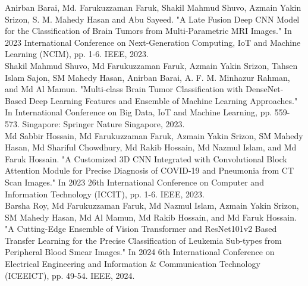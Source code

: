 \documentclass[a4paper,10pt]{article}
\begin{document}
{ Anirban Barai, Md. Farukuzzaman Faruk, Shakil Mahmud Shuvo, Azmain Yakin Srizon, S. M. Mahedy Hasan and Abu Sayeed. "A Late Fusion Deep CNN Model for the Classification of Brain Tumors from Multi-Parametric MRI Images." In 2023 International Conference on Next-Generation Computing, IoT and Machine Learning (NCIM), pp. 1-6. IEEE, 2023.
\vspace{2mm}\\
 Shakil Mahmud Shuvo, Md Farukuzzaman Faruk, Azmain Yakin Srizon, Tahsen Islam Sajon, SM Mahedy Hasan, Anirban Barai, A. F. M. Minhazur Rahman, and Md Al Mamun. "Multi-class Brain Tumor Classification with DenseNet-Based Deep Learning Features and Ensemble of Machine Learning Approaches." In International Conference on Big Data, IoT and Machine Learning, pp. 559-573. Singapore: Springer Nature Singapore, 2023.
\vspace{2mm}\\
Md Sabbir  Hossain, Md Farukuzzaman Faruk, Azmain Yakin Srizon, SM Mahedy Hasan, Md Shariful Chowdhury, Md Rakib Hossain, Md Nazmul Islam, and Md Faruk Hossain. "A Customized 3D CNN Integrated with Convolutional Block Attention Module for Precise Diagnosis of COVID-19 and Pneumonia from CT Scan Images." In 2023 26th International Conference on Computer and Information Technology (ICCIT), pp. 1-6. IEEE, 2023.
\vspace{2mm}\\
Barsha Roy, Md Farukuzzaman Faruk, Md Nazmul Islam, Azmain Yakin Srizon, SM Mahedy Hasan, Md Al Mamun, Md Rakib Hossain, and Md Faruk Hossain. "A Cutting-Edge Ensemble of Vision Transformer and ResNet101v2 Based Transfer Learning for the Precise Classification of Leukemia Sub-types from Peripheral Blood Smear Images." In 2024 6th International Conference on Electrical Engineering and Information & Communication Technology (ICEEICT), pp. 49-54. IEEE, 2024.

}
\end{document}
